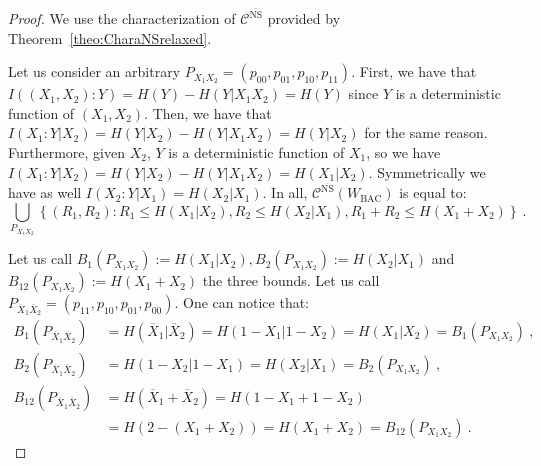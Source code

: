   \begin{proof}
    We use the characterization of $\mathcal{C}^{\overline{\mathrm{NS}}}$ provided by Theorem~\ref{theo:CharaNSrelaxed}.

    Let us consider an arbitrary $P_{X_1X_2}=(p_{00},p_{01},p_{10},p_{11})$. First, we have that $I((X_1,X_2):Y) = H(Y) - H(Y|X_1X_2) = H(Y)$ since $Y$ is a deterministic function of $(X_1,X_2)$. Then, we have that $I(X_1:Y|X_2) = H(Y|X_2) - H(Y|X_1X_2) = H(Y|X_2)$ for the same  reason. Furthermore, given $X_2$, $Y$  is a deterministic function of $X_1$, so we have $I(X_1:Y|X_2) = H(Y|X_2) - H(Y|X_1X_2) = H(X_1|X_2)$. Symmetrically we have as well $I(X_2:Y|X_1) = H(X_2|X_1)$. In all, $\mathcal{C}^{\overline{\mathrm{NS}}}(W_{\text{BAC}})$ is equal to:
    \[ \bigcup_{P_{X_1X_2}}\left\{ (R_1,R_2) : R_1 \leq H(X_1|X_2), R_2 \leq H(X_2|X_1), R_1+R_2 \leq H(X_1+X_2)\right\} \ . \]
    
    Let us call $B_1(P_{X_1X_2}):=H(X_1|X_2),B_2(P_{X_1X_2}):=H(X_2|X_1)$ and $B_{12}(P_{X_1X_2}):=H(X_1+X_2)$ the three bounds. Let us call $P_{\overline{X}_1\overline{X}_2}=(p_{11},p_{10},p_{01},p_{00})$. One can notice that:
    \begin{equation}
      \begin{aligned}
        B_1(P_{\overline{X}_1\overline{X}_2}) &= H(\overline{X}_1|\overline{X}_2) = H(1-X_1|1-X_2) = H(X_1|X_2) = B_1(P_{X_1X_2}) \ ,\\
        B_2(P_{\overline{X}_1\overline{X}_2}) &= H(1-X_2|1-X_1) = H(X_2|X_1) = B_2(P_{X_1X_2}) \ ,\\
        B_{12}(P_{\overline{X}_1\overline{X}_2}) &= H(\overline{X}_1+\overline{X}_2) = H(1-X_1+1-X_2)\\
        &= H(2-(X_1+X_2))=H(X_1+X_2) = B_{12}(P_{X_1X_2}) \ .
      \end{aligned}
    \end{equation}   
    

\end{proof}
